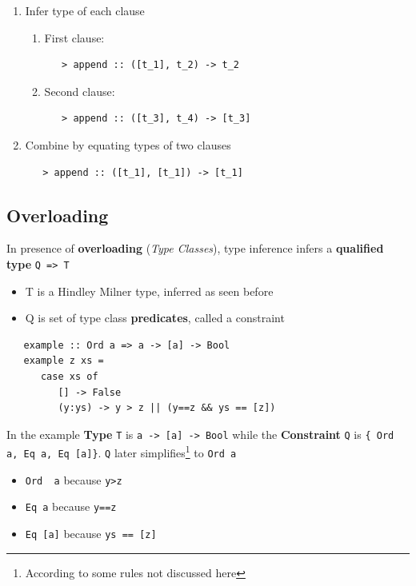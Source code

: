 \begin{enumerate}
   \item Infer type of each clause
   \begin{enumerate}
      \item First clause:
      \begin{lstlisting}
   > append :: ([t_1], t_2) -> t_2
      \end{lstlisting}
      \item Second clause:
      \begin{lstlisting}
   > append :: ([t_3], t_4) -> [t_3]
      \end{lstlisting}
   \end{enumerate}
   \item Combine by equating types of two clauses
   \begin{lstlisting}
   > append :: ([t_1], [t_1]) -> [t_1]
   \end{lstlisting}
\end{enumerate}

\subsection{Overloading}
{In presence of \textbf{overloading} (\textit{Type Classes}), type inference infers a \textbf{qualified type} \lstinline|Q => T|\ns
\begin{itemize}
   \item T is a Hindley Milner type, inferred as seen before
   \item Q is set of type class \textbf{predicates}, called a constraint
\end{itemize}}
\begin{lstlisting}
   example :: Ord a => a -> [a] -> Bool
   example z xs = 
      case xs of
         [] -> False
         (y:ys) -> y > z || (y==z && ys == [z])
\end{lstlisting}

\begin{paracol}{2}
   \colfill
   In the example \textbf{Type} \lstinline|T| is \lstinline|a -> [a] -> Bool|
   while the \textbf{Constraint} \lstinline|Q| is \lstinline|{ Ord a, Eq a, Eq [a]}|.
   \lstinline|Q| later simplifies\footnote{According to some rules not discussed here} to \lstinline|Ord a|
   \colfill
   \switchcolumn

   \begin{itemize}
      \item \lstinline|Ord  a| because \lstinline|y>z|
      \item \lstinline|Eq a| because \lstinline|y==z|
      \item \lstinline|Eq [a]| because \lstinline|ys == [z]|
   \end{itemize}
\end{paracol}

